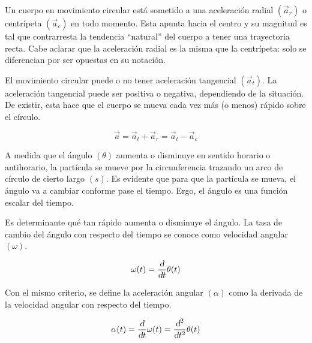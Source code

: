 Un cuerpo en movimiento circular está sometido a una aceleración radial $(\vec{a}_r)$ o centrípeta $(\Vec{a}_c)$ en todo momento.
Esta apunta hacia el centro y su magnitud es tal que contrarresta la tendencia ``natural'' del cuerpo a tener una trayectoria recta.
Cabe aclarar que la aceleración radial es la misma que la centrípeta: solo se diferencian por ser opuestas en su notación.

El movimiento circular puede o no tener aceleración tangencial $(\Vec{a}_ t)$.
La aceleración tangencial puede ser positiva o negativa, dependiendo de la situación.
De existir, esta hace que el cuerpo se mueva cada vez más (o menos) rápido sobre el círculo.

\begin{mdframed}[style=DefinitionFrame]
    \begin{defn}
    \end{defn}
    \begin{equation*}
        \Vec{a} = \Vec{a}_t + \Vec{a}_r = \Vec{a}_t - \Vec{a}_c
    \end{equation*}
\end{mdframed}

A medida que el ángulo $(\theta)$ aumenta o disminuye en sentido horario o antihorario, la partícula se mueve por la circunferencia trazando un arco de círculo de cierto largo $(s)$.
Es evidente que para que la partícula se mueva, el ángulo va a cambiar conforme pase el tiempo.
Ergo, el ángulo es una función escalar del tiempo.

Es determinante qué tan rápido aumenta o disminuye el ángulo.
La tasa de cambio del ángulo con respecto del tiempo se conoce como velocidad angular $(\omega)$.

\begin{mdframed}[style=DefinitionFrame]
    \begin{defn}
        \label{defn:angularVel}
    \end{defn}
    \begin{equation*}
        \omega (t) = \dfrac{\textsl{d}}{\textsl{d} t} \theta (t)
    \end{equation*}
\end{mdframed}

Con el mismo criterio, se define la aceleración angular $(\alpha)$ como la derivada de la velocidad angular con respecto del tiempo.

\begin{mdframed}[style=DefinitionFrame]
    \begin{defn}
        \label{defn:angularAccel}
    \end{defn}
    \begin{equation*}
        \alpha (t) = \dfrac{\textsl{d}}{\textsl{d} t} \omega (t) = \dfrac{\textsl{d}^2}{\textsl{d} t^2} \theta (t)
    \end{equation*}
\end{mdframed}

